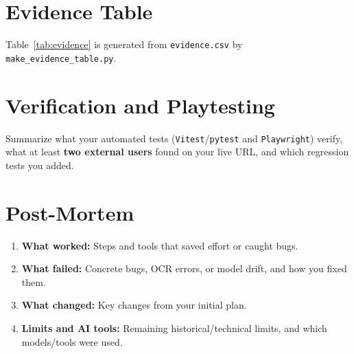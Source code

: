 \documentclass[12pt,a4paper]{article}
\renewcommand{\footnotesize}{\fontsize{10}{12}\selectfont}
\begin{document}
\section{Evidence Table}

Table~\ref{tab:evidence} is generated from \texttt{evidence.csv} by
\texttt{make\_evidence\_table.py}.

\begin{table}[htbp]
  \centering
  \footnotesize
  \singlespacing
  \renewcommand{\arraystretch}{1.25}
  
  \caption{Claims and design elements with locators, evidence tiers
  (\emph{据} documented, \emph{推断} inferred, \emph{设} invented), and limits.}
  \label{tab:evidence}
\end{table}

\section{Verification and Playtesting}

Summarize what your automated tests (\texttt{Vitest}/\texttt{pytest} and
\texttt{Playwright}) verify, what at least \textbf{two external users} found on
your live URL, and which regression tests you added.

\section{Post-Mortem}

\begin{enumerate}
  \item \textbf{What worked:} Steps and tools that saved effort or caught bugs.
  \item \textbf{What failed:} Concrete bugs, OCR errors, or model drift, and how you fixed them.
  \item \textbf{What changed:} Key changes from your initial plan.
  \item \textbf{Limits and AI tools:} Remaining historical/technical limits, and which models/tools were used.
\end{enumerate}

\singlespacing
\printbibliography[title={Bibliography}]
\end{document}
